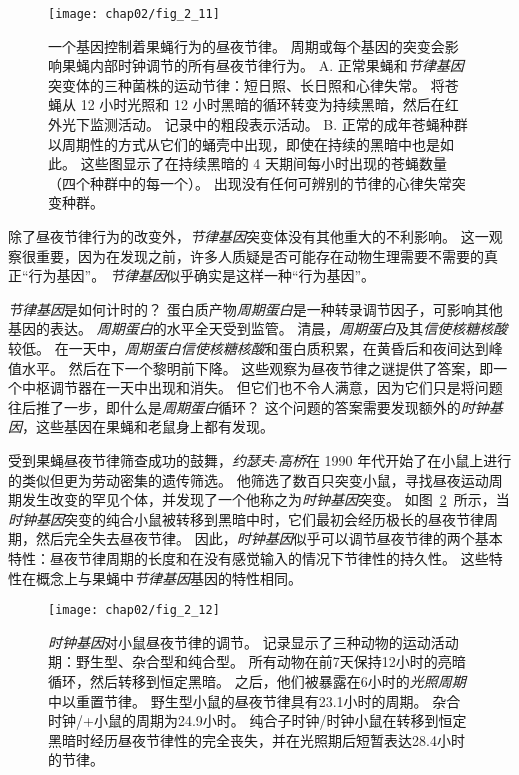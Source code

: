 \begin{figure}[htbp]
	\centering
	\texttt{[image: chap02/fig\_2\_11]}
	\caption{一个基因控制着果蝇行为的昼夜节律。
		周期或每个基因的突变会影响果蝇内部时钟调节的所有昼夜节律行为\cite{konopka1971clock}。
		A. 正常果蝇和\textit{节律基因}突变体的三种菌株的运动节律：短日照、长日照和心律失常。
		将苍蝇从 12 小时光照和 12 小时黑暗的循环转变为持续黑暗，然后在红外光下监测活动。
		记录中的粗段表示活动。
		B. 正常的成年苍蝇种群以周期性的方式从它们的蛹壳中出现，即使在持续的黑暗中也是如此。
		这些图显示了在持续黑暗的 4 天期间每小时出现的苍蝇数量（四个种群中的每一个）。
		出现没有任何可辨别的节律的心律失常突变种群。}
	\label{fig:2_11}
\end{figure}


除了昼夜节律行为的改变外，\textit{节律基因}突变体没有其他重大的不利影响。
这一观察很重要，因为在发现之前，许多人质疑是否可能存在动物生理需要不需要的真正“行为基因”。
\textit{节律基因}似乎确实是这样一种“行为基因”。


\textit{节律基因}是如何计时的？
蛋白质产物\textit{周期蛋白}是一种转录调节因子，可影响其他基因的表达。
\textit{周期蛋白}的水平全天受到监管。
清晨，\textit{周期蛋白}及其\textit{信使核糖核酸}较低。
在一天中，\textit{周期蛋白}\textit{信使核糖核酸}和蛋白质积累，在黄昏后和夜间达到峰值水平。
然后在下一个黎明前下降。
这些观察为昼夜节律之谜提供了答案，即一个中枢调节器在一天中出现和消失。
但它们也不令人满意，因为它们只是将问题往后推了一步，即什么是\textit{周期蛋白}循环？
这个问题的答案需要发现额外的\textit{时钟基因}，这些基因在果蝇和老鼠身上都有发现。



受到果蝇昼夜节律筛查成功的鼓舞，\textit{约瑟夫$\cdot$高桥}在 1990 年代开始了在小鼠上进行的类似但更为劳动密集的遗传筛选。
他筛选了数百只突变小鼠，寻找昼夜运动周期发生改变的罕见个体，并发现了一个他称之为\textit{时钟基因}突变。
如图~\ref{fig:2_12}~所示，当\textit{时钟基因}突变的纯合小鼠被转移到黑暗中时，它们最初会经历极长的昼夜节律周期，然后完全失去昼夜节律。
因此，\textit{时钟基因}似乎可以调节昼夜节律的两个基本特性：昼夜节律周期的长度和在没有感觉输入的情况下节律性的持久性。
这些特性在概念上与果蝇中\textit{节律基因}基因的特性相同。




\begin{figure}[htbp]
	\centering
	\texttt{[image: chap02/fig\_2\_12]}
	\caption{\textit{时钟基因}对小鼠昼夜节律的调节。
		记录显示了三种动物的运动活动期：野生型、杂合型和纯合型。
		所有动物在前7天保持12小时的亮暗循环，然后转移到恒定黑暗。
		之后，他们被暴露在6小时的\textit{光照周期}中以重置节律。
		野生型小鼠的昼夜节律具有23.1小时的周期。
		杂合时钟/+小鼠的周期为24.9小时。
		纯合子时钟/时钟小鼠在转移到恒定黑暗时经历昼夜节律性的完全丧失，并在光照期后短暂表达28.4小时的节律\cite{takahashi1994forward}。}
	\label{fig:2_12}
\end{figure}


